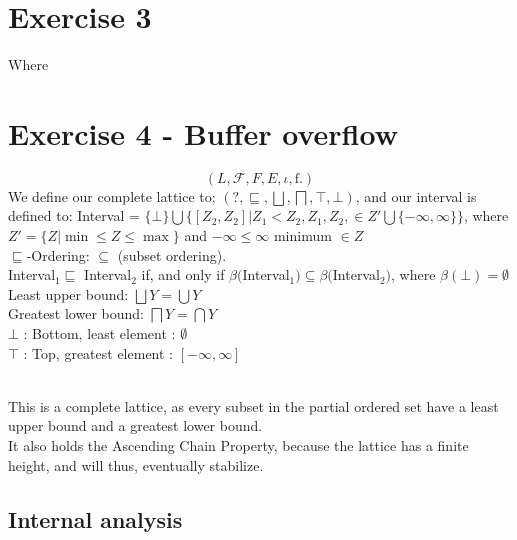 \documentclass[12pt]{article}
\begin{document}
\section*{Exercise 3}

Where 

\section*{Exercise 4 - Buffer overflow}
\begin{equation}
  \left(L, \mathcal{F}, F, E, \iota, \mathrm{f}.  \right)
  \label{eq:monotone_framework}
\end{equation}
We define our complete lattice to; $(?,\sqsubseteq,\bigsqcup, \bigsqcap, \top, \bot )$, and our interval is defined to: Interval = $\{\bot\} \bigcup \{[Z_2, Z_2] | Z_1 < Z_2, Z_1, Z_2, \in Z' \bigcup \{- \infty, \infty \} \} $, where $Z' = \{ Z | \min \leq Z \leq \max \}$ and $ - \infty \leq \infty $ minimum $ \in Z$\\
$\sqsubseteq$-Ordering: $\subseteq$ (subset ordering).\\
Interval$_1 \sqsubseteq $ Interval$_2 $ if, and only if $\beta($Interval$_1) \subseteq \beta($Interval$_2)$, where $\beta(\bot) = \emptyset$\\
Least upper bound: $\bigsqcup Y = \bigcup Y$\\
Greatest lower bound: $\bigsqcap Y = \bigcap Y$\\
$\bot$ : Bottom, least element : $\emptyset$\\
$\top$ : Top, greatest element : $[-\infty, \infty]$\\\

This is a complete lattice, as every subset in the partial ordered set have a least upper bound and a greatest lower bound.\\
It also holds the Ascending Chain Property, because the lattice has a finite height, and will thus, eventually stabilize.


\subsection*{Internal analysis}
\end{document}
